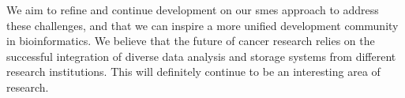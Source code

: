 We aim to refine and continue development on our \glspl{sme} approach to address
these challenges, and that we can inspire a more unified development community
in bioinformatics. We believe that the future of cancer research relies on the
successful integration of diverse data analysis and storage systems from
different research institutions.  This will definitely continue to be an
interesting area of research.


